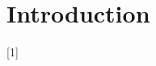 \chapter{Introduction}
\setcounter{page}{1}

\begin{chapterabstract}
	\lipsum[1]
\end{chapterabstract}

\lipsum[2][1-4]{} [1]

\lipsum[4]

